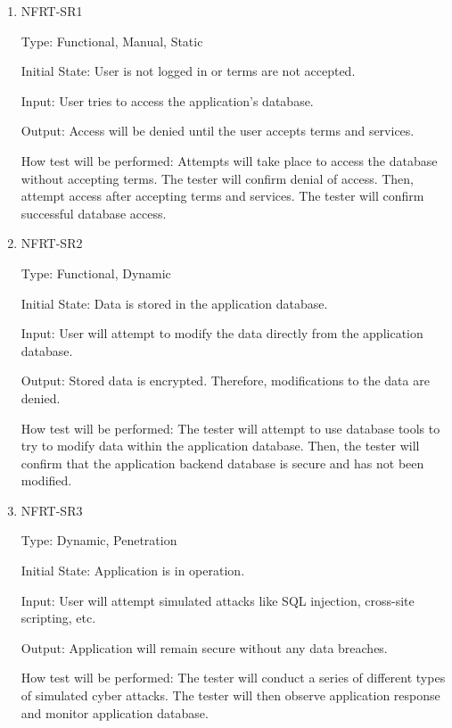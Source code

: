 \documentclass[12pt, titlepage]{article}
\begin{document}
\begin{enumerate}
\item{NFRT-SR1\\}

Type: Functional, Manual, Static

Initial State: User is not logged in or terms are not accepted.
                
Input: User tries to access the application's database.
                
Output: Access will be denied until the user accepts terms and services.
                
How test will be performed: Attempts will take place to access the database without accepting terms. The tester will confirm denial of access. Then, attempt access after accepting terms and services. The tester will confirm successful database access.

\item{NFRT-SR2\\}

Type: Functional, Dynamic

Initial State: Data is stored in the application database.
                
Input: User will attempt to modify the data directly from the application database.
                
Output: Stored data is encrypted. Therefore, modifications to the data are denied.
                
How test will be performed: The tester will attempt to use database tools to try to modify data within the application database. Then, the tester will confirm that the application backend database is secure and has not been modified.

\item{NFRT-SR3\\}

Type: Dynamic, Penetration

Initial State: Application is in operation.
                
Input: User will attempt simulated attacks like SQL injection, cross-site scripting, etc.
                
Output: Application will remain secure without any data breaches.
                
How test will be performed: The tester will conduct a series of different types of simulated cyber attacks. The tester will then observe application response and monitor application database.


\end{enumerate}
\end{document}
